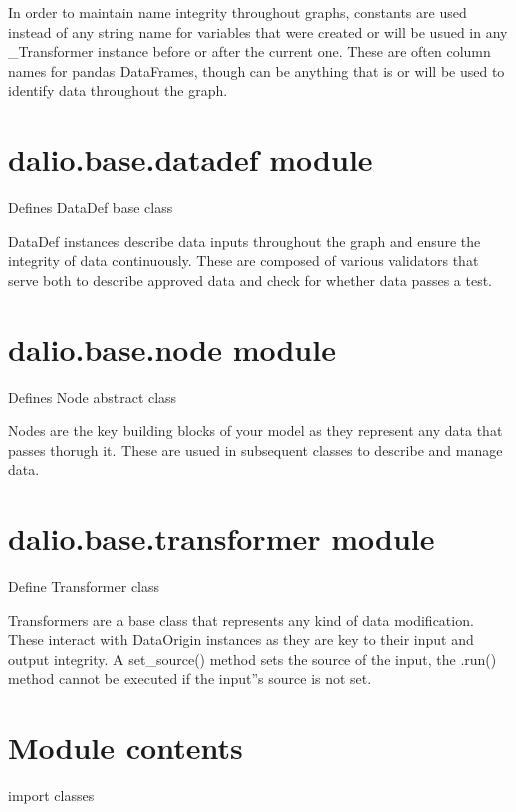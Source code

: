 \documentclass[letterpaper,10pt,english]{sphinxmanual}
\begin{document}
In order to maintain name integrity throughout graphs, constants are used
instead of any string name for variables that were created or will be usued in
any \_Transformer instance before or after the current one. These are often
column names for pandas DataFrames, though can be anything that is or will be
used to identify data throughout the graph.


\section{dalio.base.datadef module}
\label{\detokenize{dalio.base:module-dalio.base.datadef}}\label{\detokenize{dalio.base:dalio-base-datadef-module}}
Defines DataDef base class

DataDef instances describe data inputs throughout the graph and ensure the
integrity of data continuously. These are composed of various validators that
serve both to describe approved data and check for whether data passes a test.


\section{dalio.base.node module}
\label{\detokenize{dalio.base:module-dalio.base.node}}\label{\detokenize{dalio.base:dalio-base-node-module}}
Defines Node abstract class

Nodes are the key building blocks of your model as they represent any data
that passes thorugh it. These are usued in subsequent classes to describe and
manage data.


\section{dalio.base.transformer module}
\label{\detokenize{dalio.base:module-dalio.base.transformer}}\label{\detokenize{dalio.base:dalio-base-transformer-module}}
Define Transformer class

Transformers are a base class that represents any kind of data modification.
These interact with DataOrigin instances as they are key to their input and
output integrity. A set\_source() method sets the source of the input, the
.run() method cannot be executed if the input”s source is not set.


\section{Module contents}
\label{\detokenize{dalio.base:module-dalio.base}}\label{\detokenize{dalio.base:module-contents}}
import classes
\end{document}
